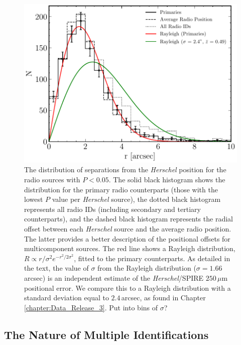 \begin{figure}
	\centering
	\includegraphics[width=0.8\columnwidth]{Figures/source_counterpart_offsets.pdf}
	\caption[Distribution of radial offsets between \textit{Herschel} sources and radio IDs]{The distribution of separations from the \textit{Herschel} position for the radio sources with $P < 0.05$. The solid black histogram shows the distribution for the primary radio counterparts (those with the lowest $P$ value per \textit{Herschel} source), the dotted black histogram represents all radio IDs (including secondary and tertiary counterparts), and the dashed black histogram represents the radial offset between each \textit{Herschel} source and the average radio position. The latter provides a better description of the positional offsets for multicomponent sources. The red line shows a Rayleigh distribution, $R \propto r/\sigma^2 e^{-r^2/2\sigma^2}$, fitted to the primary counterparts. As detailed in the text, the value of $\sigma$ from the Rayleigh distribution ($\sigma = 1.66\,$arcsec) is an independent estimate of the \textit{Herschel}/SPIRE $250\,\mu$m positional error. We compare this to a Rayleigh distribution with a standard deviation equal to $2.4\,$arcsec, as found in Chapter \ref{chapter:Data_Release_3}. {\color{red}Put into bins of $\sigma$?}}
	\label{fig:source_counterpart_offset}
\end{figure}

\subsection{The Nature of Multiple Identifications}
\label{sec:multiple_systems}

